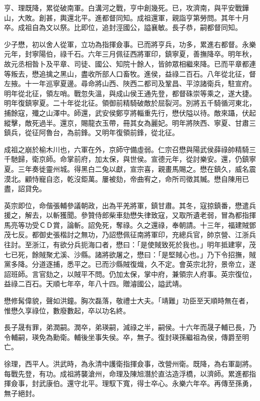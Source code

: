 \begin{pinyinscope}
亨、理既降，累從破南軍。白溝河之戰，亨中創幾死。已，攻濟南，與平安戰鏵山，大敗。創甚，輿還北平。進都督同知。成祖還軍，親詣亨第勞問。其年十月卒。成祖自為文以祭。比即位，追封涇國公，謚襄敏。長子恭，嗣都督同知。

少子懋，初以舍人從軍，立功為指揮僉事。已而將亨兵，功多，累進右都督。永樂元年，封寧陽伯，祿千石。六年三月佩征西將軍印，鎮寧夏，善撫降卒。明年秋，故元丞相昝卜及平章、司徒、國公、知院十餘人，皆帥眾相繼來降。已而平章都連等叛去，懋追擒之黑山，盡收所部人口畜牧。進侯，益祿二百石。八年從北征，督左掖。十一年巡寧夏邊。尋命將山西、陜西二都司及鞏昌、平涼諸衛兵，駐宣府。明年從北征，領左哨。戰忽失溫，與成山侯王通先登，都督硃崇等乘之，遂大捷。明年復鎮寧夏。二十年從北征。領御前精騎破敵於屈裂河。別將五千騎循河東北，捕餘寇，殲之山澤中。師還，武安侯鄭亨將輜重先行，懋伏隘以待。敵來躡，伏起縱擊，敵死過半。還京，賜龍衣玉帶，冊其女為麗妃。明年將陜西、寧夏、甘肅三鎮兵，從征阿魯台，為前鋒。又明年復領前鋒，從北征。

成祖之崩於榆木川也，六軍在外，京師守備虛弱。仁宗召懋與陽武侯薛祿帥精騎三千馳歸，衛京師。命掌前府，加太保，與世侯。宣德元年，從討樂安。還，仍鎮寧夏。三年奏徙靈州城。得黑白二兔以獻，宣宗喜，親畫馬賜之。懋在鎮久，威名震漠北。顧恃寵自恣，乾沒鉅萬。屢被劾，帝曲宥之，命所司徵其贓。懋自陳用已盡，詔貸免。

英宗即位，命偕張輔參議朝政，出為平羌將軍，鎮甘肅。其冬，寇掠鎮番，懋遣兵援之，解去，以斬獲聞。參贊侍郎柴車劾懋失律致寇，又取所遺老弱，冒為都指揮馬亮等功受ＣＤ賞，論斬。詔免死，奪祿。久之還祿，奉朝請。十三年，福建賊鄧茂七反。都御史張楷討之無功，乃詔懋佩征南將軍印，充總兵官，帥京營、江浙兵往討。至浙江，有欲分兵扼海口者，懋曰：「是使賊致死於我也。」明年抵建寧，茂七已死，餘賊聚尤溪、沙縣。諸將欲屠之，懋曰：「是堅賊心也。」乃下令招撫，賊黨多降。分道逐捕，悉平之。已而沙縣賊復熾，久不定。會英宗北狩，景帝立，遂詔班師。言官劾之，以賊平不問。仍加太保，掌中府，兼領宗人府事。英宗復位，益祿二百石。天順七年卒，年八十四。贈濬國公，謚武靖。

懋修髯偉貌，聲如洪鐘。胸次磊落，敬禮士大夫。「靖難」功臣至天順時無在者，惟懋久享祿位，數廢數起，卒以功名終。

長子晟有罪，弟潤嗣。潤卒，弟瑛嗣，減祿之半，嗣侯。十六年而晟子輔已長，乃令輔嗣，瑛免為勳衛。輔後坐事失侯。卒，無子。復封瑛孫繼祖為侯，傳爵至明亡。

徐理，西平人。洪武時，為永清中護衛指揮僉事，改營州衛。既降，為右軍副將。每戰先登，有功。成祖將襲滄州，命理及陳旭潛於直沽造浮橋，以濟師。累進都指揮僉事，封武康伯。還守北平。理馭下寬，得士卒心。永樂六年卒。再傳至孫勇，無子絕封。


\end{pinyinscope}

